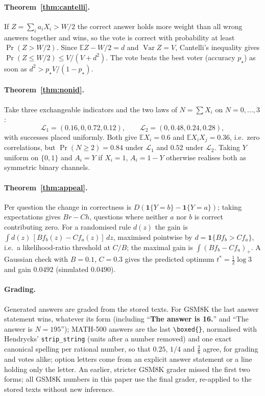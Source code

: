 \documentclass[11pt]{article}
\theoremstyle{definition}
\theoremstyle{remark}
\begin{document}
\paragraph{Theorem~\ref{thm:cantelli}.}
If $Z=\sum_ia_iX_i>W/2$ the correct answer holds more weight than all wrong answers together and wins,
so the vote is correct with probability at least $\Pr(Z>W/2)$. Since $\mathbb E Z-W/2=d$ and
$\operatorname{Var}Z=V$, Cantelli's inequality gives $\Pr(Z\le W/2)\le V/(V+d^2)$. The vote beats the best
voter (accuracy $p_\star$) as soon as $d^2>p_\star V/(1-p_\star)$.

\paragraph{Theorem~\ref{thm:nonid}.}
Take three exchangeable indicators and the two laws of $N=\sum X_i$ on $N=0,\dots,3$:
\[
\mathcal L_1=(0.16,0,0.72,0.12),\qquad
\mathcal L_2=(0,0.48,0.24,0.28),
\]
with successes placed uniformly. Both give $\mathbb E X_i=0.6$ and $\mathbb E X_iX_j=0.36$, i.e.\ zero correlations, but
$\Pr(N\ge2)=0.84$ under $\mathcal L_1$ and $0.52$ under $\mathcal L_2$. Taking $Y$ uniform on $\{0,1\}$ and
$A_i=Y$ if $X_i=1$, $A_i=1-Y$ otherwise realises both as symmetric binary channels.

\paragraph{Theorem~\ref{thm:appeal}.}
Per question the change in correctness is $D(\mathbf 1\{Y=b\}-\mathbf 1\{Y=a\})$; taking expectations gives
$Br-Ch$, questions where neither $a$ nor $b$ is correct contributing zero. For a randomised rule $d(z)$ the
gain is $\int d(z)\,[Bf_b(z)-Cf_a(z)]\,dz$, maximised pointwise by $d=\mathbf 1\{Bf_b>Cf_a\}$, i.e.\ a
likelihood-ratio threshold at $C/B$; the maximal gain is $\int(Bf_b-Cf_a)_+$. A Gaussian check with
$B=0.1$, $C=0.3$ gives the predicted optimum $t^*=\tfrac12\log3$ and gain $0.0492$ (simulated $0.0490$).

\paragraph{Grading.}\label{app:grader}
Generated answers are graded from the stored texts. For GSM8K the last answer statement wins, whatever
its form (including ``\textbf{The answer is 16.}'' and ``The answer is $N=195$''); MATH-500 answers are the
last \texttt{\textbackslash boxed\{\}}, normalised with Hendrycks' \texttt{strip\_string} (units after a
number removed) and one exact canonical spelling per rational number, so that $0.25$, $1/4$ and
$\frac{2}{8}$ agree, for grading and votes alike; option letters come from an explicit answer statement or a line
holding only the letter. An earlier, stricter GSM8K grader missed the first two forms; all GSM8K numbers
in this paper use the final grader, re-applied to the stored texts without new inference.
\end{document}
